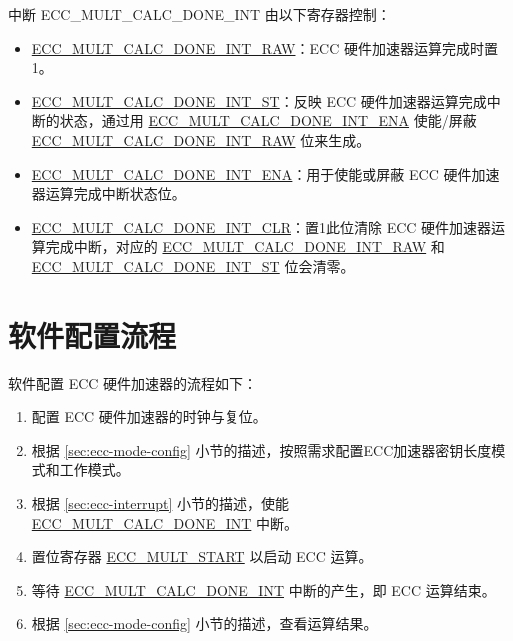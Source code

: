 \documentclass[main\_\_CN.tex]{subfiles}
\begin{document}
中断 ECC\_MULT\_CALC\_DONE\_INT 由以下寄存器控制：
\begin{itemize}
    \item \hyperref[fielddesc:ECCMULTCALCDONEINTRAW]{ECC\_MULT\_CALC\_DONE\_INT\_RAW}：ECC 硬件加速器运算完成时置1。
    \item \hyperref[fielddesc:ECCMULTCALCDONEINTST]{ECC\_MULT\_CALC\_DONE\_INT\_ST}：反映 ECC 硬件加速器运算完成中断的状态，通过用 \hyperref[fielddesc:ECCMULTCALCDONEINTENA]{ECC\_MULT\_CALC\_DONE\_INT\_ENA} 使能/屏蔽 \hyperref[fielddesc:ECCMULTCALCDONEINTRAW]{ECC\_MULT\_CALC\_DONE\_INT\_RAW} 位来生成。
    \item \hyperref[fielddesc:ECCMULTCALCDONEINTENA]{ECC\_MULT\_CALC\_DONE\_INT\_ENA}：用于使能或屏蔽 ECC 硬件加速器运算完成中断状态位。
    \item \hyperref[fielddesc:ECCMULTCALCDONEINTCLR]{ECC\_MULT\_CALC\_DONE\_INT\_CLR}：置1此位清除 ECC 硬件加速器运算完成中断，对应的 \hyperref[fielddesc:ECCMULTCALCDONEINTRAW]{ECC\_MULT\_CALC\_DONE\_INT\_RAW} 和 \hyperref[fielddesc:ECCMULTCALCDONEINTST]{ECC\_MULT\_CALC\_DONE\_INT\_ST} 位会清零。
\end{itemize}

\section{软件配置流程}
软件配置 ECC 硬件加速器的流程如下：
\begin{enumerate}
    \item 配置 ECC 硬件加速器的时钟与复位。
    \item 根据 \ref{sec:ecc-mode-config} 小节的描述，按照需求配置ECC加速器密钥长度模式和工作模式。
    \item 根据 \ref{sec:ecc-interrupt} 小节的描述，使能 \hyperref[int:ECCMULTCALCDONEINT]{ECC\_MULT\_CALC\_DONE\_INT} 中断。
    \item 置位寄存器 \hyperref[fielddesc:ECCMULTSTART]{ECC\_MULT\_START} 以启动 ECC 运算。
    \item 等待 \hyperref[int:ECCMULTCALCDONEINT]{ECC\_MULT\_CALC\_DONE\_INT} 中断的产生，即 ECC 运算结束。
    \item 根据 \ref{sec:ecc-mode-config} 小节的描述，查看运算结果。
\end{enumerate}


\end{document}
